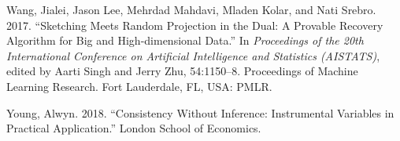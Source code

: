 \documentclass[]{article}
\begin{document}
\leavevmode\hypertarget{ref-WangLee2017}{}%
Wang, Jialei, Jason Lee, Mehrdad Mahdavi, Mladen Kolar, and Nati Srebro.
2017. ``Sketching Meets Random Projection in the Dual: A Provable
Recovery Algorithm for Big and High-dimensional Data.'' In
\emph{Proceedings of the 20th International Conference on Artificial
Intelligence and Statistics (AISTATS)}, edited by Aarti Singh and Jerry
Zhu, 54:1150--8. Proceedings of Machine Learning Research. Fort
Lauderdale, FL, USA: PMLR.

\leavevmode\hypertarget{ref-Young2018}{}%
Young, Alwyn. 2018. ``Consistency Without Inference: Instrumental
Variables in Practical Application.'' London School of Economics.
\end{document}
